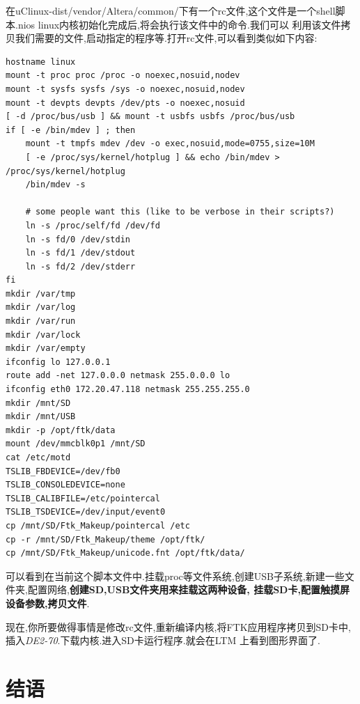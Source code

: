 \documentclass[12pt,a4paper,titlepage]{article}
\begin{document}
在uClinux-dist/vendor/Altera/common/下有一个rc文件,这个文件是一个shell脚本.nios linux内核初始化完成后,将会执行该文件中的命令.我们可以
利用该文件拷贝我们需要的文件,启动指定的程序等.打开rc文件,可以看到类似如下内容:
\begin{verbatim}
hostname linux
mount -t proc proc /proc -o noexec,nosuid,nodev
mount -t sysfs sysfs /sys -o noexec,nosuid,nodev
mount -t devpts devpts /dev/pts -o noexec,nosuid
[ -d /proc/bus/usb ] && mount -t usbfs usbfs /proc/bus/usb
if [ -e /bin/mdev ] ; then
	mount -t tmpfs mdev /dev -o exec,nosuid,mode=0755,size=10M
	[ -e /proc/sys/kernel/hotplug ] && echo /bin/mdev > /proc/sys/kernel/hotplug
	/bin/mdev -s

	# some people want this (like to be verbose in their scripts?)
	ln -s /proc/self/fd /dev/fd
	ln -s fd/0 /dev/stdin
	ln -s fd/1 /dev/stdout
	ln -s fd/2 /dev/stderr
fi
mkdir /var/tmp
mkdir /var/log
mkdir /var/run
mkdir /var/lock
mkdir /var/empty
ifconfig lo 127.0.0.1
route add -net 127.0.0.0 netmask 255.0.0.0 lo
ifconfig eth0 172.20.47.118 netmask 255.255.255.0
mkdir /mnt/SD
mkdir /mnt/USB
mkdir -p /opt/ftk/data
mount /dev/mmcblk0p1 /mnt/SD
cat /etc/motd
TSLIB_FBDEVICE=/dev/fb0
TSLIB_CONSOLEDEVICE=none
TSLIB_CALIBFILE=/etc/pointercal
TSLIB_TSDEVICE=/dev/input/event0
cp /mnt/SD/Ftk_Makeup/pointercal /etc
cp -r /mnt/SD/Ftk_Makeup/theme /opt/ftk/
cp /mnt/SD/Ftk_Makeup/unicode.fnt /opt/ftk/data/
\end{verbatim}
可以看到在当前这个脚本文件中.挂载proc等文件系统,创建USB子系统,新建一些文件夹,配置网络,\textbf{创建SD,USB文件夹用来挂载这两种设备,
挂载SD卡,配置触摸屏设备参数,拷贝文件}.

现在,你所要做得事情是修改rc文件,重新编译内核,将FTK应用程序拷贝到SD卡中,插入\textit{DE2-70}.下载内核.进入SD卡运行程序.就会在LTM
上看到图形界面了.
\setcounter{footnote}{0}
\newpage{}
\section{结语}
\end{document}
